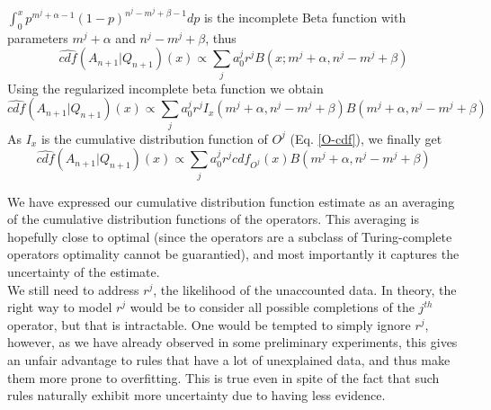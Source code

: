 \documentclass[runningheads]{llncs}
\begin{document}
$\displaystyle\int_0^x p^{m^j+\alpha - 1}(1-p)^{n^j-m^j+\beta - 1} dp$
is the incomplete Beta function with parameters $m^j+\alpha$ and
$n^j-m^j+\beta$, thus
\begin{equation}
  \label{betaconsol-3}
  \hat{cdf}(A_{n+1}|Q_{n+1})(x) \propto \sum_j a_0^j r^j
  B(x; m^j+\alpha, n^j-m^j+\beta)
\end{equation}
Using the regularized incomplete beta function we obtain
\begin{equation}
  \label{betaconsol-4}
  \hat{cdf}(A_{n+1}|Q_{n+1})(x) \propto \sum_j a_0^j r^j
  I_x(m^j+\alpha, n^j-m^j+\beta)
  B(m^j+\alpha, n^j-m^j+\beta)
\end{equation}
As $I_x$ is the cumulative distribution function of $O^j$
(Eq. \ref{O-cdf}), we finally get
\begin{equation}
  \label{betaconsol-5}
  \hat{cdf}(A_{n+1}|Q_{n+1})(x) \propto \sum_j a_0^j r^j cdf_{O^j}(x)
  B(m^j+\alpha, n^j-m^j+\beta)
\end{equation}

We have expressed our cumulative distribution function estimate as an
averaging of the cumulative distribution functions of the
operators. This averaging is hopefully close to optimal (since the
operators are a subclass of Turing-complete operators optimality
cannot be guarantied), and most importantly it captures the
uncertainty of the estimate.\\

We still need to address $r^j$, the likelihood of the unaccounted
data. In theory, the right way to model $r^j$ would be to consider all
possible completions of the $j^{th}$ operator, but that is
intractable. One would be tempted to simply ignore $r^j$, however, as
we have already observed in some preliminary experiments, this gives
an unfair advantage to rules that have a lot of unexplained data, and
thus make them more prone to overfitting. This is true even in spite
of the fact that such rules naturally exhibit more uncertainty due to
having less evidence.
\end{document}
